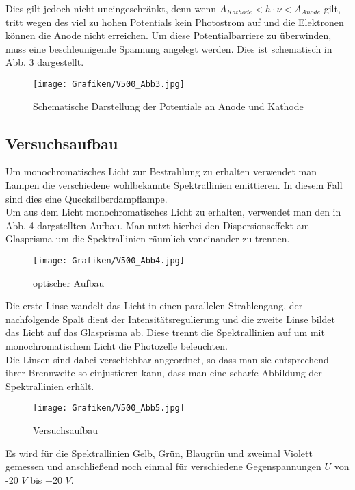 Dies gilt jedoch nicht uneingeschränkt, denn wenn $A_{Kathode} < h \cdot \nu <  A_{Anode}$ gilt, tritt wegen des viel zu hohen Potentials kein Photostrom auf und die Elektronen können die Anode nicht erreichen. Um diese Potentialbarriere zu überwinden, muss eine beschleunigende Spannung angelegt werden. Dies ist schematisch in Abb. 3 dargestellt.\\

\begin{figure}[h]
	\centering
	\texttt{[image: Grafiken/V500\_Abb3.jpg]}
	\caption{Schematische Darstellung der Potentiale an Anode und Kathode\cite{V500}}
\end{figure}

\subsection{Versuchsaufbau}

Um monochromatisches Licht zur Bestrahlung zu erhalten verwendet man Lampen die verschiedene wohlbekannte Spektrallinien emittieren. In diesem Fall sind dies eine Quecksilberdampflampe.\\
Um aus dem Licht monochromatisches Licht zu erhalten, verwendet man den in Abb. 4 dargstellten Aufbau. Man nutzt hierbei den Dispersionseffekt am Glasprisma um die Spektrallinien räumlich voneinander zu trennen. 

\begin{figure}[h]
	\centering
	\texttt{[image: Grafiken/V500\_Abb4.jpg]}
	\caption{optischer Aufbau\cite{V500}}
\end{figure}

Die erste Linse wandelt das Licht in einen parallelen Strahlengang, der nachfolgende Spalt dient der Intensitätsregulierung und die zweite Linse bildet das Licht auf das Glasprisma ab. Diese trennt die Spektrallinien auf um mit monochromatischem Licht die Photozelle beleuchten.\\
Die Linsen sind dabei verschiebbar angeordnet, so dass man sie entsprechend ihrer Brennweite so einjustieren kann, dass man eine scharfe Abbildung der Spektrallinien erhält. 

\begin{figure}[h]
	\centering
	\texttt{[image: Grafiken/V500\_Abb5.jpg]}
	\caption{Versuchsaufbau\cite{V500}}
\end{figure}

Es wird für die Spektrallinien Gelb, Grün, Blaugrün und zweimal Violett gemessen und anschließend noch einmal für verschiedene Gegenspannungen $U$ von -20 $V$ bis +20 $V$.
